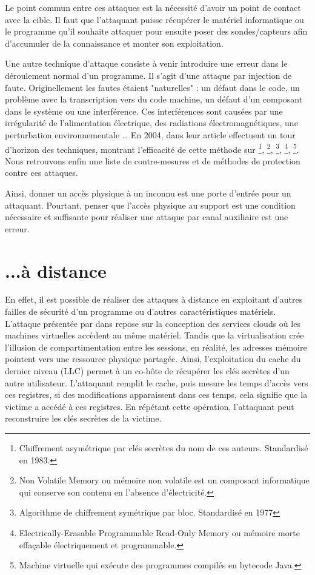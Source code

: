 Le point commun entre ces attaques est la nécessité d'avoir un point de contact avec la cible. Il faut que l'attaquant puisse récupérer le matériel informatique ou le programme qu'il souhaite attaquer pour ensuite poser des sondes/capteurs afin d'accumuler de la connaissance et monter son exploitation.\bigbreak


Une autre technique d'attaque consiste à venir introduire une erreur dans le déroulement normal d'un programme. Il s'agit d'une attaque par injection de faute. Originellement \cite{faultOverview} les fautes étaient "naturelles" : un défaut dans le code, un problème avec la transcription vers du code machine, un défaut d'un composant dans le système ou une interférence. Ces interférences sont causées par une irrégularité de l'alimentation électrique, des radiations électromagnétiques, une perturbation environnementale \etc\dots
En 2004, \citeauthor{Fault_Attacks} dans leur article  \cite{Fault_Attacks} effectuent un tour d'horizon des techniques, montrant l'efficacité de cette méthode sur \footnote{Chiffrement asymétrique par clés secrètes du nom de ces auteurs. Standardisé en 1983.}, \footnote{Non Volatile Memory ou mémoire non volatile est un composant informatique qui conserve son contenu en l'absence d'électricité.}, \footnote{Algorithme de chiffrement symétrique par bloc. Standardisé en 1977}, \footnote{Electrically-Erasable Programmable Read-Only Memory ou mémoire morte effaçable électriquement et programmable.}, \footnote{Machine virtuelle qui exécute des programmes compilés en bytecode Java.}. Nous retrouvons enfin une liste de contre-mesures et de méthodes de protection contre ces attaques.\medbreak

Ainsi, donner un accès physique à un inconnu est une porte d'entrée pour un attaquant. Pourtant, penser que l'accès physique au support est une condition nécessaire et suffisante pour réaliser une attaque par canal auxiliaire est une erreur.

\section{...à distance}

En effet, il est possible de réaliser des attaques à distance en exploitant d'autres failles de sécurité d'un programme ou d'autres caractéristiques matériels. L'attaque présentée par \citeauthor{LLC_attack} dans  \cite{LLC_attack} repose sur la conception des services clouds où les machines virtuelles accèdent au même matériel. Tandis que la virtualisation crée l'illusion de compartimentation entre les sessions, en réalité, les adresses mémoire pointent vers une ressource physique partagée. Ainsi, l'exploitation du cache du dernier niveau (LLC) permet à un co-hôte de récupérer les clés secrètes d'un autre utilisateur. L'attaquant remplit le cache, puis mesure les temps d'accès vers ces registres, si des modifications apparaissent dans ces temps, cela signifie que la victime a accédé à ces registres. En répétant cette opération, l'attaquant peut reconstruire les clés secrètes de la victime.\medbreak


